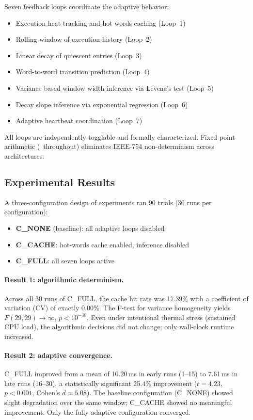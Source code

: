 Seven feedback loops coordinate the adaptive behavior:

\begin{itemize}
  \item Execution heat tracking and hot-words caching (Loop~1)
  \item Rolling window of execution history (Loop~2)
  \item Linear decay of quiescent entries (Loop~3)
  \item Word-to-word transition prediction (Loop~4)
  \item Variance-based window width inference via Levene's test (Loop~5)
  \item Decay slope inference via exponential regression (Loop~6)
  \item Adaptive heartbeat coordination (Loop~7)
\end{itemize}

All loops are independently togglable and formally characterized. Fixed-point
arithmetic (\Qtype\ throughout) eliminates IEEE-754 non-determinism across
architectures.

\subsection{Experimental Results}

A three-configuration design of experiments ran 90 trials (30 runs per
configuration):

\begin{itemize}
  \item \textbf{C\_NONE} (baseline): all adaptive loops disabled
  \item \textbf{C\_CACHE}: hot-words cache enabled, inference disabled
  \item \textbf{C\_FULL}: all seven loops active
\end{itemize}

\paragraph{Result 1: algorithmic determinism.}
Across all 30 runs of C\_FULL, the cache hit rate was 17.39\% with a
coefficient of variation (CV) of exactly 0.00\%. The F-test for variance
homogeneity yields $F(29,29) \to \infty$, $p < 10^{-30}$. Even under
intentional thermal stress (sustained CPU load), the algorithmic decisions
did not change; only wall-clock runtime increased.

\paragraph{Result 2: adaptive convergence.}
C\_FULL improved from a mean of 10.20\,ms in early runs (1--15) to 7.61\,ms
in late runs (16--30), a statistically significant 25.4\% improvement
($t = 4.23$, $p < 0.001$, Cohen's $d \approx 5.08$). The baseline
configuration (C\_NONE) showed slight degradation over the same window;
C\_CACHE showed no meaningful improvement. Only the fully adaptive
configuration converged.

